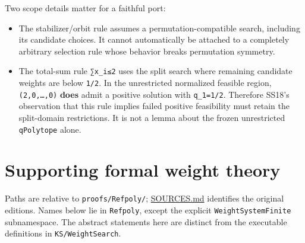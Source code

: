 \documentclass[11pt,a4paper,oneside]{report}
\providecommand{\tightlist}{%
  \setlength{\itemsep}{0pt}\setlength{\parskip}{0pt}}
\begin{document}
Two scope details matter for a faithful port:

\begin{itemize}
\tightlist
\item
  The stabilizer/orbit rule assumes a permutation-compatible search,
  including its candidate choices. It cannot automatically be attached
  to a completely arbitrary selection rule whose behavior breaks
  permutation symmetry.
\item
  The total-sum rule \texttt{∑x\_\allowbreak{}i≤2} uses the split search
  where remaining candidate weights are below \texttt{1/\allowbreak{}2}.
  In the unrestricted normalized feasible region,
  \texttt{(\allowbreak{}2,\allowbreak{}0,\allowbreak{}…,\allowbreak{}0)}
  \textbf{does} admit a positive solution with
  \texttt{q\_\allowbreak{}1=\allowbreak{}1/\allowbreak{}2}. Therefore
  SS18's observation that this rule implies failed positive feasibility
  must retain the split-domain restrictions. It is not a lemma about the
  frozen unrestricted \texttt{qPolytop\allowbreak{}e} alone.
\end{itemize}

\section{Supporting formal weight
theory}\label{weight-enumeration-and-degree-bounds--supporting-formal-weight-theory}

Paths are relative to \texttt{proofs/\allowbreak{}Refpoly/};
\href{../../proofs/SOURCES.md}{SOURCES.md} identifies the original
editions. Names below lie in \texttt{Refpoly}, except the explicit
\texttt{WeightSy\allowbreak{}stemFini\allowbreak{}te} subnamespace. The
abstract statements here are distinct from the executable definitions in
\texttt{KS/\allowbreak{}WeightSe\allowbreak{}arch}.
\end{document}
